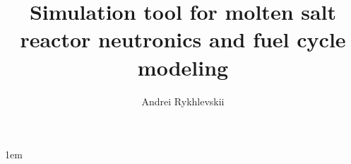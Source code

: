 \documentclass[tocnosub,noragright,centerchapter,12pt,fullpage]{uiucecethesis09}
\title{Simulation tool for molten salt reactor neutronics and fuel cycle modeling}
\author{Andrei Rykhlevskii}
\begin{document}

%
\maketitle

\parindent 1em%

\frontmatter

%
\begin{abstract}

\end{abstract}

%

%
%
%
\tableofcontents

%

%

%
\end{document}
